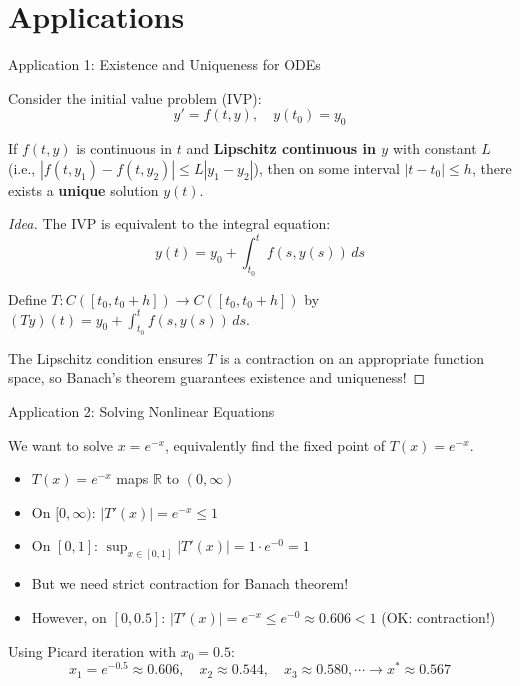 \documentclass[aspectratio=169,10pt]{beamer}
\begin{document}
\section{Applications}

\begin{frame}{Application 1: Existence and Uniqueness for ODEs}
    \begin{theorem}
        Consider the initial value problem (IVP):
        \[
            y' = f(t,y), \quad y(t_0) = y_0
        \]

        If $f(t,y)$ is continuous in $t$ and \textbf{Lipschitz continuous in $y$} with constant $L$ (i.e., $|f(t,y_1) - f(t,y_2)| \leq L|y_1 - y_2|$), then on some interval $|t - t_0| \leq h$, there exists a \textbf{unique} solution $y(t)$.
    \end{theorem}

    \vspace{0.3cm}
    \begin{proof}[Idea]
        The IVP is equivalent to the integral equation:
        \[
            y(t) = y_0 + \int_{t_0}^t f(s, y(s)) \, ds
        \]

        Define $T: C([t_0, t_0+h]) \to C([t_0, t_0+h])$ by $(Ty)(t) = y_0 + \int_{t_0}^t f(s,y(s))\,ds$.

        The Lipschitz condition ensures $T$ is a contraction on an appropriate function space, so Banach's theorem guarantees existence and uniqueness!
    \end{proof}
\end{frame}

\begin{frame}{Application 2: Solving Nonlinear Equations}
    \begin{example}[Equation: $x = e^{-x}$]
        We want to solve $x = e^{-x}$, equivalently find the fixed point of $T(x) = e^{-x}$.

        \vspace{0.3cm}
        \begin{itemize}
            \item $T(x) = e^{-x}$ maps $\mathbb{R}$ to $(0, \infty)$
            \item On $[0, \infty)$: $|T'(x)| = e^{-x} \leq 1$
            \item On $[0, 1]$: $\sup_{x \in [0,1]} |T'(x)| = 1 \cdot e^{-0} = 1$
            \item But we need strict contraction for Banach theorem!

            \vspace{0.2cm}
            \item However, on $[0, 0.5]$: $|T'(x)| = e^{-x} \leq e^{-0} \approx 0.606 < 1$ (OK: contraction!)
        \end{itemize}

        \vspace{0.3cm}
        Using Picard iteration with $x_0 = 0.5$:
        \[
            x_1 = e^{-0.5} \approx 0.606, \quad x_2 \approx 0.544, \quad x_3 \approx 0.580, \cdots \to x^* \approx 0.567
        \]
    \end{example}
\end{frame}
\end{document}
